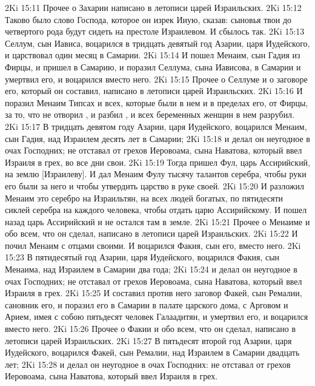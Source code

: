\rsbpar\vs 2Ki 15:11 Прочее о Захарии написано в летописи царей Израильских.
\vs 2Ki 15:12 Таково было слово Господа, которое он изрек Ииую, сказав: сыновья твои до четвертого рода будут сидеть на престоле Израилевом. И сбылось так.
\rsbpar\vs 2Ki 15:13 Селлум, сын Иависа, воцарился в тридцать девятый год Азарии, царя Иудейского, и царствовал один месяц в Самарии.
\vs 2Ki 15:14 И пошел Менаим, сын Гадия из Фирцы, и пришел в Самарию, и поразил Селлума, сына Иависова, в Самарии и умертвил его, и воцарился вместо него.
\rsbpar\vs 2Ki 15:15 Прочее о Селлуме и о заговоре его, который он составил, написано в летописи царей Израильских.
\vs 2Ki 15:16 И поразил Менаим Типсах и всех, которые были в нем и в пределах его,  от Фирцы, за то, что  не отворил , и разбил , и всех беременных женщин в нем разрубил.
\rsbpar\vs 2Ki 15:17 В тридцать девятом году Азарии, царя Иудейского, воцарился Менаим, сын Гадия, над Израилем  десять лет в Самарии;
\vs 2Ki 15:18 и делал он неугодное в очах Господних; не отставал от грехов Иеровоама, сына Наватова, который ввел Израиля в грех, во все дни свои.
\vs 2Ki 15:19 Тогда пришел Фул, царь Ассирийский, на землю [Израилеву]. И дал Менаим Фулу тысячу талантов серебра, чтобы руки его были за него и чтобы утвердить царство в руке своей.
\vs 2Ki 15:20 И разложил Менаим это серебро на Израильтян, на всех людей богатых, по пятидесяти сиклей серебра на каждого человека, чтобы отдать царю Ассирийскому. И пошел назад царь Ассирийский и не остался там в земле.
\rsbpar\vs 2Ki 15:21 Прочее о Менаиме и обо всем, что он сделал, написано в летописи царей Израильских.
\vs 2Ki 15:22 И почил Менаим с отцами своими. И воцарился Факия, сын его, вместо него.
\rsbpar\vs 2Ki 15:23 В пятидесятый год Азарии, царя Иудейского, воцарился Факия, сын Менаима, над Израилем в Самарии  два года;
\vs 2Ki 15:24 и делал он неугодное в очах Господних; не отставал от грехов Иеровоама, сына Наватова, который ввел Израиля в грех.
\vs 2Ki 15:25 И составил против него заговор Факей, сын Ремалии, сановник его, и поразил его в Самарии в палате царского дома, с Арговом и Арием, имея с собою пятьдесят человек Галаадитян, и умертвил его, и воцарился вместо него.
\rsbpar\vs 2Ki 15:26 Прочее о Факии и обо всем, что он сделал, написано в летописи царей Израильских.
\rsbpar\vs 2Ki 15:27 В пятьдесят второй год Азарии, царя Иудейского, воцарился Факей, сын Ремалии, над Израилем в Самарии  двадцать лет;
\vs 2Ki 15:28 и делал он неугодное в очах Господних: не отставал от грехов Иеровоама, сына Наватова, который ввел Израиля в грех.
